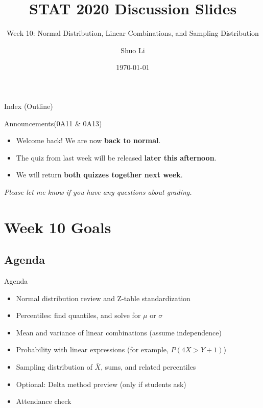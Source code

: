 \documentclass[aspectratio=169]{beamer}
\title[STAT 2020 Week 10 \hfill \insertframenumber/\inserttotalframenumber]{STAT 2020 Discussion Slides}
\subtitle{Week 10: Normal Distribution, Linear Combinations, and Sampling Distribution}
\author{Shuo Li}
\institute{University of Iowa}
\date{\today}
\begin{document}
\begin{frame}
  \titlepage
\end{frame}

\begin{frame}{Index (Outline)}
  \tableofcontents[hideallsubsections]
\end{frame}

\begin{frame}{Announcements(0A11 \& 0A13)}
\begin{itemize}
    \item Welcome back! We are now \textbf{back to normal}.
    \item The quiz from last week will be released \textbf{later this afternoon}.
    \item We will return \textbf{both quizzes together next week}.
\end{itemize}

\vspace{0.5cm}

\textit{Please let me know if you have any questions about grading.}
\end{frame}

\section{Week 10 Goals}

\subsection{Agenda}
\begin{frame}{Agenda}
  \begin{itemize}
    \item Normal distribution review and Z-table standardization
    \item Percentiles: find quantiles, and solve for \(\mu\) or \(\sigma\)
    \item Mean and variance of linear combinations (assume independence)
    \item Probability with linear expressions (for example, \(P(4X>Y+1)\))
    \item Sampling distribution of \(\bar X\), sums, and related percentiles
    \item Optional: Delta method preview (only if students ask)
    \item Attendance check
  \end{itemize}
\end{frame}
\end{document}
